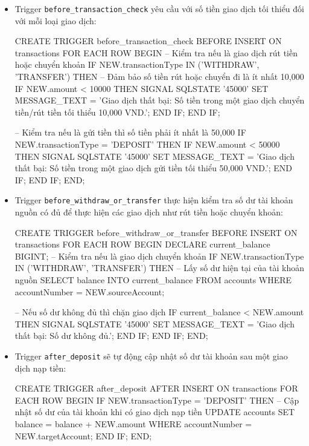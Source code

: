 \begin{itemize}
    \item Trigger \texttt{before\_transaction\_check} yêu cầu với số tiền giao dịch tối thiểu đối với mỗi loại giao dịch:
    \begin{MySQLCode}
    CREATE TRIGGER before_transaction_check
    BEFORE INSERT ON transactions
    FOR EACH ROW
    BEGIN
        -- Kiểm tra nếu là giao dịch rút tiền hoặc chuyển khoản
        IF NEW.transactionType IN ('WITHDRAW', 'TRANSFER') THEN
            -- Đảm bảo số tiền rút hoặc chuyển đi là ít nhất 10,000
            IF NEW.amount < 10000 THEN
                SIGNAL SQLSTATE '45000'
                SET MESSAGE_TEXT = 'Giao dịch thất bại: Số tiền trong một giao dịch chuyển tiền/rút tiền tối thiểu 10,000 VND.';
            END IF;
        END IF;

        -- Kiểm tra nếu là gửi tiền thì số tiền phải ít nhất là 50,000
        IF NEW.transactionType = 'DEPOSIT' THEN
            IF NEW.amount < 50000 THEN
                SIGNAL SQLSTATE '45000'
                SET MESSAGE_TEXT = 'Giao dịch thất bại: Số tiền trong một giao dịch gửi tiền tối thiểu 50,000 VND.';
            END IF;
        END IF;
    END;
    \end{MySQLCode}
    
    \item Trigger \texttt{before\_withdraw\_or\_transfer} thực hiện kiểm tra số dư tài khoản nguồn có đủ để thực hiện các giao dịch như rút tiền hoặc chuyển khoản:
    \begin{MySQLCode}
    CREATE TRIGGER before_withdraw_or_transfer
    BEFORE INSERT ON transactions
    FOR EACH ROW
    BEGIN
        DECLARE current_balance BIGINT;
        -- Kiểm tra nếu là giao dịch chuyển khoản
        IF NEW.transactionType IN ('WITHDRAW', 'TRANSFER') THEN
            -- Lấy số dư hiện tại của tài khoản nguồn
            SELECT balance INTO current_balance
            FROM accounts
            WHERE accountNumber = NEW.sourceAccount;

            -- Nếu số dư không đủ thì chặn giao dịch
            IF current_balance < NEW.amount THEN
                SIGNAL SQLSTATE '45000'
                SET MESSAGE_TEXT = 'Giao dịch thất bại: Số dư không đủ.';
            END IF;
        END IF;
    END;
    \end{MySQLCode}

    \item Trigger \texttt{after\_deposit} sẽ tự động cập nhật số dư tài khoản sau một giao dịch nạp tiền:
    \begin{MySQLCode}
    CREATE TRIGGER after_deposit
    AFTER INSERT ON transactions
    FOR EACH ROW
    BEGIN
        IF NEW.transactionType = 'DEPOSIT' THEN
            -- Cập nhật số dư của tài khoản khi có giao dịch nạp tiền
            UPDATE accounts
            SET balance = balance + NEW.amount
            WHERE accountNumber = NEW.targetAccount;
        END IF;
    END;
    \end{MySQLCode}


\end{itemize}
